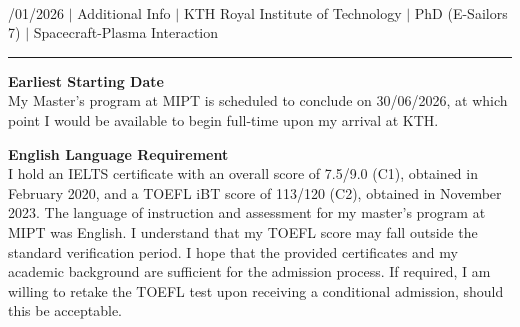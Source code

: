 \documentclass[a4paper,12pt]{article}
\begin{document}
{\centering
  {\scshape {}} \\
  {\fontsize{10}{10}/01/2026} $|$
  {\fontsize{10}{10}\selectfont Additional Info} $|$
  {\fontsize{10}{10}\selectfont KTH Royal Institute of Technology} $|$
  {\fontsize{10}{10}\selectfont PhD (E-Sailors 7)} $|$
  {\fontsize{10}{10}\selectfont Spacecraft-Plasma Interaction}
\par}
\vspace{-20pt}
\noindent\rule{\textwidth}{0.5pt}

\vspace{-10pt}

\noindent \textbf{Earliest Starting Date}\\
My Master's program at MIPT is scheduled to conclude on 30/06/2026, at which point I would be available to begin full-time upon my arrival at KTH.

\noindent \textbf{English Language Requirement}\\
I hold an IELTS certificate with an overall score of 7.5/9.0 (C1), obtained in February 2020, and a TOEFL iBT score of 113/120 (C2), obtained in November 2023. The language of instruction and assessment for my master’s program at MIPT was English. I understand that my TOEFL score may fall outside the standard verification period. I hope that the provided certificates and my academic background are sufficient for the admission process. If required, I am willing to retake the TOEFL test upon receiving a conditional admission, should this be acceptable.
\end{document}
